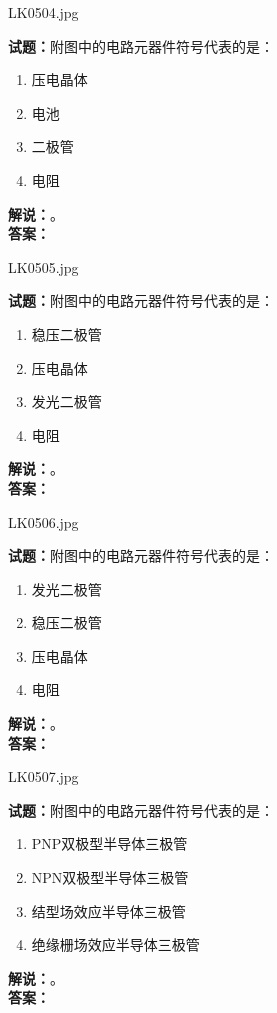 \documentclass{ctexbook}
\begin{document}
\vspace{\baselineskip}

LK0504.jpg

\noindent\textbf{试题：}附图中的电路元器件符号代表的是：
\begin{enumerate}[leftmargin=3em]
  \item 压电晶体
  \item 电池
  \item 二极管
  \item 电阻
\end{enumerate}
\noindent\textbf{解说：}\textbf{}。\\\noindent\textbf{答案：}

\vspace{\baselineskip}

LK0505.jpg

\noindent\textbf{试题：}附图中的电路元器件符号代表的是：
\begin{enumerate}[leftmargin=3em]
  \item 稳压二极管
  \item 压电晶体
  \item 发光二极管
  \item 电阻
\end{enumerate}
\noindent\textbf{解说：}\textbf{}。\\\noindent\textbf{答案：}

\vspace{\baselineskip}

LK0506.jpg

\noindent\textbf{试题：}附图中的电路元器件符号代表的是：
\begin{enumerate}[leftmargin=3em]
  \item 发光二极管
  \item 稳压二极管
  \item 压电晶体
  \item 电阻
\end{enumerate}
\noindent\textbf{解说：}\textbf{}。\\\noindent\textbf{答案：}

\vspace{\baselineskip}

LK0507.jpg

\noindent\textbf{试题：}附图中的电路元器件符号代表的是：
\begin{enumerate}[leftmargin=3em]
  \item PNP双极型半导体三极管
  \item NPN双极型半导体三极管
  \item 结型场效应半导体三极管
  \item 绝缘栅场效应半导体三极管
\end{enumerate}
\noindent\textbf{解说：}\textbf{}。\\\noindent\textbf{答案：}
\end{document}
